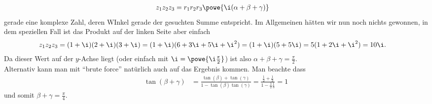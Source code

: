 \documentclass[english, parskip=full]{scrartcl}
\begin{document}
\begin{align}
z_1z_2z_3 &= r_1r_2r_3 \powe{\i (\alpha+\beta+\gamma)}
\end{align}
gerade eine komplexe Zahl, deren WInkel gerade der gesuchten Summe entspricht.
Im Allgemeinen hätten wir nun noch nichts gewonnen, in dem speziellen Fall ist das Produkt auf der linken Seite aber einfach
\begin{align}
z_1z_2z_3 &= (1+\i)(2+\i)(3+\i) = (1+\i) (6 + 3\i + 5\i + \i^2) = (1+\i) (5 + 5\i) = 5(1 + 2\i + \i^2) = 10\i.
\end{align}
Da dieser Wert auf der $y$-Achse liegt (oder einfach mit $\i=\powe{\i\frac{\pi}{2}}$) ist also $\alpha + \beta + \gamma = \frac{\pi}{2}$.\\
Alternativ kann man mit ``brute force'' natürlich auch auf das Ergebnis kommen.
Man beachte dass
\begin{align}
\tan(\beta + \gamma) &= \frac{\tan(\beta) + \tan(\gamma)}{1 - \tan(\beta) \tan(\gamma)} = \frac{\frac{1}{2} + \frac{1}{3}}{1 - \frac{1}{2} \frac{1}{3}} = 1
\end{align}
und somit $\beta + \gamma = \frac{\pi}{4}$.

\end{document}
